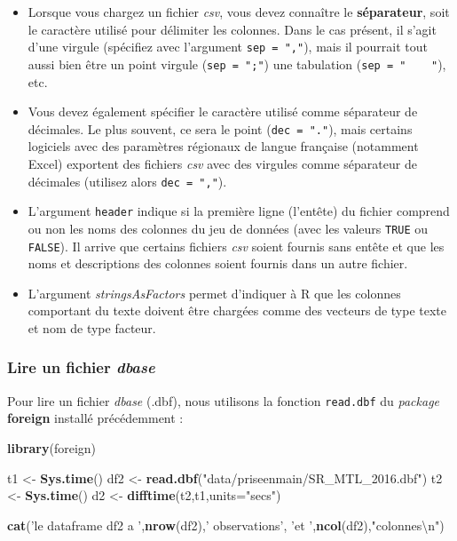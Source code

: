 \documentclass[
  11pt,
  french,
]{book}
\makeatletter
\newenvironment{Shaded}{\begin{snugshade}}{\end{snugshade}}
\newcommand{\CharTok}[1]{\textcolor[rgb]{0.31,0.60,0.02}{#1}}
\newcommand{\DataTypeTok}[1]{\textcolor[rgb]{0.13,0.29,0.53}{#1}}
\newcommand{\KeywordTok}[1]{\textcolor[rgb]{0.13,0.29,0.53}{\textbf{#1}}}
\newcommand{\NormalTok}[1]{#1}
\newcommand{\StringTok}[1]{\textcolor[rgb]{0.31,0.60,0.02}{#1}}
\providecommand{\tightlist}{%
  \setlength{\itemsep}{0pt}\setlength{\parskip}{0pt}}
\newenvironment{kframe}{%
\medskip{}
\setlength{\fboxsep}{.8em}
 \def\at@end@of@kframe{}%
 \ifinner\ifhmode%
  \def\at@end@of@kframe{\end{minipage}}%
  \begin{minipage}{\columnwidth}%
 \fi\fi%
 \def\FrameCommand##1{\hskip\@totalleftmargin \hskip-\fboxsep
 \colorbox{shadecolor}{##1}\hskip-\fboxsep
     \hskip-\linewidth \hskip-\@totalleftmargin \hskip\columnwidth}%
 \MakeFramed {\advance\hsize-\width
   \@totalleftmargin\z@ \linewidth\hsize
   \@setminipage}}%
 {\par\unskip\endMakeFramed%
 \at@end@of@kframe}
\renewenvironment{Shaded}{\begin{kframe}}{\end{kframe}}
\makeatother
\begin{document}
\begin{itemize}
\tightlist
\item
  Lorsque vous chargez un fichier \emph{csv}, vous devez connaître le \textbf{séparateur}, soit le caractère utilisé pour délimiter les colonnes. Dans le cas présent, il s'agit d'une virgule (spécifiez avec l'argument \texttt{sep\ =\ ","}), mais il pourrait tout aussi bien être un point virgule (\texttt{sep\ =\ ";"}) une tabulation (\texttt{sep\ =\ "\ \ \ \ "}), etc.
\item
  Vous devez également spécifier le caractère utilisé comme séparateur de décimales. Le plus souvent, ce sera le point (\texttt{dec\ =\ "."}), mais certains logiciels avec des paramètres régionaux de langue française (notamment Excel) exportent des fichiers \emph{csv} avec des virgules comme séparateur de décimales (utilisez alors \texttt{dec\ =\ ","}).
\item
  L'argument \texttt{header} indique si la première ligne (l'entête) du fichier comprend ou non les noms des colonnes du jeu de données (avec les valeurs \texttt{TRUE} ou \texttt{FALSE}). Il arrive que certains fichiers \emph{csv} soient fournis sans entête et que les noms et descriptions des colonnes soient fournis dans un autre fichier.
\item
  L'argument \emph{stringsAsFactors} permet d'indiquer à R que les colonnes comportant du texte doivent être chargées comme des vecteurs de type texte et nom de type facteur.
\end{itemize}

\hypertarget{sect01412}{%
\subsubsection{\texorpdfstring{Lire un fichier \emph{dbase}}{Lire un fichier dbase}}\label{sect01412}}

Pour lire un fichier \emph{dbase} (.dbf), nous utilisons la fonction \texttt{read.dbf} du \emph{package} \textbf{foreign} installé précédemment :

\begin{Shaded}
\begin{Highlighting}[]
\KeywordTok{library}\NormalTok{(foreign)}

\NormalTok{t1 <-}\StringTok{ }\KeywordTok{Sys.time}\NormalTok{()}
\NormalTok{df2 <-}\StringTok{ }\KeywordTok{read.dbf}\NormalTok{(}\StringTok{"data/priseenmain/SR_MTL_2016.dbf"}\NormalTok{)}
\NormalTok{t2 <-}\StringTok{ }\KeywordTok{Sys.time}\NormalTok{()}
\NormalTok{d2 <-}\StringTok{ }\KeywordTok{difftime}\NormalTok{(t2,t1,}\DataTypeTok{units=}\StringTok{"secs"}\NormalTok{)}

\KeywordTok{cat}\NormalTok{(}\StringTok{'le dataframe df2 a '}\NormalTok{,}\KeywordTok{nrow}\NormalTok{(df2),}\StringTok{' observations'}\NormalTok{,}
    \StringTok{'et '}\NormalTok{,}\KeywordTok{ncol}\NormalTok{(df2),}\StringTok{"colonnes}\CharTok{\textbackslash{}n}\StringTok{"}\NormalTok{)}
\end{Highlighting}
\end{Shaded}
\end{document}
